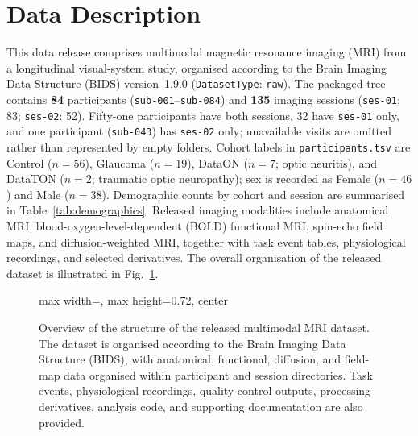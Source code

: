 \section{Data Description}
\label{sec:data_description}

This data release comprises multimodal magnetic resonance imaging (MRI) from a longitudinal visual-system study, organised according to the Brain Imaging Data Structure (BIDS) version~1.9.0 (\texttt{DatasetType}: \texttt{raw}). The packaged tree contains \textbf{84} participants (\texttt{sub-001}--\texttt{sub-084}) and \textbf{135} imaging sessions (\texttt{ses-01}: 83; \texttt{ses-02}: 52). Fifty-one participants have both sessions, 32 have \texttt{ses-01} only, and one participant (\texttt{sub-043}) has \texttt{ses-02} only; unavailable visits are omitted rather than represented by empty folders. Cohort labels in \texttt{participants.tsv} are Control ($n=56$), Glaucoma ($n=19$), DataON ($n=7$; optic neuritis), and DataTON ($n=2$; traumatic optic neuropathy); sex is recorded as Female ($n=46$) and Male ($n=38$). Demographic counts by cohort and session are summarised in Table~\ref{tab:demographics}. Released imaging modalities include anatomical MRI, blood-oxygen-level-dependent (BOLD) functional MRI, spin-echo field maps, and diffusion-weighted MRI, together with task event tables, physiological recordings, and selected derivatives. The overall organisation of the released dataset is illustrated in Fig.~\ref{fig:dataset_overview}.



\begin{figure}[htbp]
    \centering
    \begin{adjustbox}{max width=\linewidth, max height=0.72\textheight, center}
    \end{adjustbox}
    \caption{Overview of the structure of the released multimodal MRI dataset. The dataset is organised according to the Brain Imaging Data Structure (BIDS), with anatomical, functional, diffusion, and field-map data organised within participant and session directories. Task events, physiological recordings, quality-control outputs, processing derivatives, analysis code, and supporting documentation are also provided.}
    \label{fig:dataset_overview}
\end{figure}

